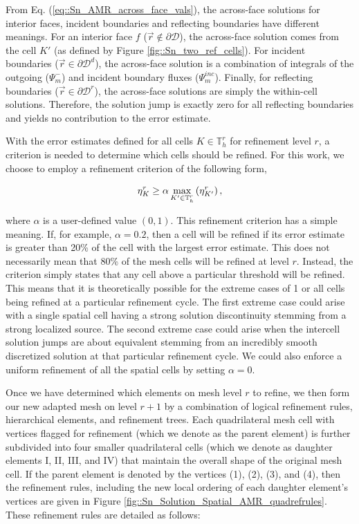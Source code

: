 \noindent From Eq. (\ref{eq::Sn_AMR_across_face_vals}), the across-face solutions for interior faces, incident boundaries and reflecting boundaries have different meanings. For an interior face $f$ ($\vec{r} \notin \partial \mathcal{D}$), the across-face solution comes from the cell $K'$ (as defined by Figure \ref{fig::Sn_two_ref_cells}). For incident boundaries ($\vec{r} \in \partial \mathcal{D}^d$), the across-face solution is a combination of integrals of the outgoing ($\Psi_m^-$) and incident boundary fluxes ($\Psi_m^{inc}$). Finally, for reflecting boundaries ($\vec{r} \in \partial \mathcal{D}^r$), the across-face solutions are simply the within-cell solutions. Therefore, the solution jump is exactly zero for all reflecting boundaries and yields no contribution to the error estimate.

With the error estimates defined for all cells $K \in \mathbb{T}_h^r$ for refinement level $r$, a criterion is needed to determine which cells should be refined. For this work, we choose to employ a refinement criterion of the following form,

\begin{equation}
\label{eq::Sn_AMR_err_crit}
\eta_K^r \geq \alpha \max\displaylimits_{K' \in \mathbb{T}_h^r} \left(  \eta_{K'}^{r} \right),
\end{equation}

\noindent where $\alpha$ is a user-defined value $(0,1)$. This refinement criterion has a simple meaning. If, for example, $\alpha = 0.2$, then a cell will be refined if its error estimate is greater than 20\% of the cell with the largest error estimate. This does not necessarily mean that 80\% of the mesh cells will be refined at level $r$. Instead, the criterion simply states that any cell above a particular threshold will be refined. This means that it is theoretically possible for the extreme cases of 1 or all cells being refined at a particular refinement cycle. The first extreme case could arise with a single spatial cell having a strong solution discontinuity stemming from a strong localized source. The second extreme case could arise when the intercell solution jumps are about equivalent stemming from an incredibly smooth discretized solution at that particular refinement cycle. We could also enforce a uniform refinement of all the spatial cells by setting $\alpha=0$.

Once we have determined which elements on mesh level $r$ to refine, we then form our new adapted mesh on level $r+1$ by a combination of logical refinement rules, hierarchical elements, and refinement trees. Each quadrilateral mesh cell with vertices flagged for refinement (which we denote as the parent element) is further subdivided into four smaller quadrilateral cells (which we denote as daughter elements I, II, III, and IV) that maintain the overall shape of the original mesh cell. If the parent element is denoted by the vertices (1), (2), (3), and (4), then the refinement rules, including the new local ordering of each daughter element's vertices are given in Figure \ref{fig::Sn_Solution_Spatial_AMR_quadrefrules}. These refinement rules are detailed as follows:

